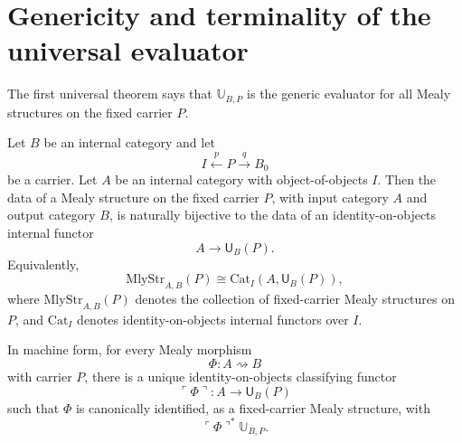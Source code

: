 \section{Genericity and terminality of the universal evaluator}
\label{sec:genericity-terminality-universal-evaluator}

The first universal theorem says that \(\mathbb U_{B,P}\) is the generic evaluator for all
Mealy structures on the fixed carrier \(P\).

\begin{theorem}
\label{thm:genericity-universal-mealy}
Let \(B\) be an internal category and let
\[
        I \xleftarrow{p} P \xrightarrow{q} B_0
\]
be a carrier.  Let \(A\) be an internal category with object-of-objects \(I\).  Then the data of a
Mealy structure on the fixed carrier \(P\), with input category \(A\) and output category \(B\), is
naturally bijective to the data of an identity-on-objects internal functor
\[
        A\longrightarrow \mathsf U_B(P).
\]
Equivalently,
\[
        \mathrm{MlyStr}_{A,B}(P)
        \cong
        \mathrm{Cat}_I(A,\mathsf U_B(P)),
\]
where \(\mathrm{MlyStr}_{A,B}(P)\) denotes the collection of fixed-carrier Mealy structures on
\(P\), and \(\mathrm{Cat}_I\) denotes identity-on-objects internal functors over \(I\).

In machine form, for every Mealy morphism
\[
        \Phi:A\rightsquigarrow B
\]
with carrier \(P\), there is a unique identity-on-objects classifying functor
\[
        \ulcorner\Phi\urcorner:A\longrightarrow\mathsf U_B(P)
\]
such that \(\Phi\) is canonically identified, as a fixed-carrier Mealy structure, with
\[
        \ulcorner\Phi\urcorner^{\ast}\mathbb U_{B,P}.
\]
\end{theorem}


